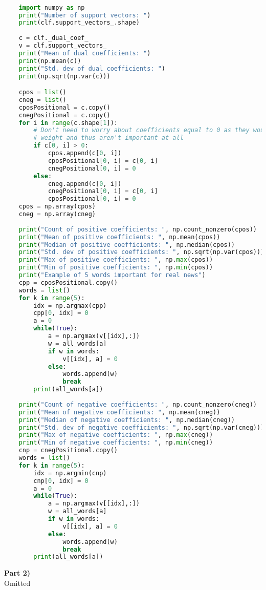 \documentclass{article}
\begin{document}
\begin{lstlisting}[language=Python, caption=Statistics and Important Words]

    import numpy as np
    print("Number of support vectors: ")
    print(clf.support_vectors_.shape)
    
    c = clf._dual_coef_
    v = clf.support_vectors_
    print("Mean of dual coefficients: ")
    print(np.mean(c))
    print("Std. dev of dual coefficients: ")
    print(np.sqrt(np.var(c)))

    cpos = list()
    cneg = list()
    cposPositional = c.copy()
    cnegPositional = c.copy()
    for i in range(c.shape[1]):
        # Don't need to worry about coefficients equal to 0 as they would hold no
        # weight and thus aren't important at all
        if c[0, i] > 0:
            cpos.append(c[0, i])
            cposPositional[0, i] = c[0, i]
            cnegPositional[0, i] = 0
        else:
            cneg.append(c[0, i])
            cnegPositional[0, i] = c[0, i]
            cposPositional[0, i] = 0
    cpos = np.array(cpos)
    cneg = np.array(cneg)
    
    print("Count of positive coefficients: ", np.count_nonzero(cpos))
    print("Mean of positive coefficients: ", np.mean(cpos))
    print("Median of positive coefficients: ", np.median(cpos))
    print("Std. dev of positive coefficients: ", np.sqrt(np.var(cpos)))
    print("Max of positive coefficients: ", np.max(cpos))
    print("Min of positive coefficients: ", np.min(cpos))
    print("Example of 5 words important for real news")
    cpp = cposPositional.copy()
    words = list()
    for k in range(5):
        idx = np.argmax(cpp)
        cpp[0, idx] = 0
        a = 0
        while(True):
            a = np.argmax(v[[idx],:])
            w = all_words[a]
            if w in words:
                v[[idx], a] = 0
            else:
                words.append(w)
                break
        print(all_words[a])
    
    print("Count of negative coefficients: ", np.count_nonzero(cneg))
    print("Mean of negative coefficients: ", np.mean(cneg))
    print("Median of negative coefficients: ", np.median(cneg))
    print("Std. dev of negative coefficients: ", np.sqrt(np.var(cneg)))
    print("Max of negative coefficients: ", np.max(cneg))
    print("Min of negative coefficients: ", np.min(cneg))
    cnp = cnegPositional.copy()
    words = list()
    for k in range(5):
        idx = np.argmin(cnp)
        cnp[0, idx] = 0
        a = 0
        while(True):
            a = np.argmax(v[[idx],:])
            w = all_words[a]
            if w in words:
                v[[idx], a] = 0
            else:
                words.append(w)
                break
        print(all_words[a])

\end{lstlisting}
\clearpage

\textbf{Part 2)}\\
Omitted
\end{document}
